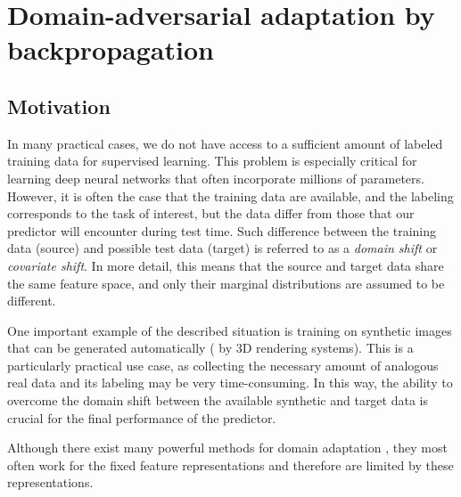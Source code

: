 \chapter{Domain-adversarial adaptation by backpropagation}
\label{chapt:gradrev}
%
%


\section{Motivation}




In many practical cases, we do not have access to a sufficient amount of labeled training data for supervised learning. This problem is especially critical for learning deep neural networks that often incorporate millions of parameters. However, it is often the case that the training data are available, and the labeling corresponds to the task of interest, but the data differ from those that our predictor will encounter during test time. Such difference between the training data (source) and possible test data (target) is referred to as a \textit{domain shift} or \textit{covariate shift}. In more detail, this means that the source and target data share the same feature space, and only their marginal distributions are assumed to be different. 

One important example of the described situation is training on synthetic images that can be generated automatically (\eg{} by 3D rendering systems). This is a particularly practical use case, as collecting the necessary amount of analogous real data and its labeling may be very time-consuming. 
In this way, the ability to overcome the domain shift between the available synthetic and target data is crucial for the final performance of the predictor. 


Although there exist many powerful methods for domain adaptation \cite{huang2007correcting, pan2008transfer, pan2011domain,baktashmotlagh2013unsupervised,gong2012geodesic,gong2013connecting}, they most often work for the fixed feature representations and therefore are limited by these representations. %

